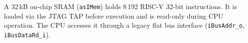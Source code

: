 A 32\,kB on-chip SRAM (\texttt{asIMem}) holds 8\,192 RISC-V 32-bit
instructions.
It is loaded via the JTAG TAP before execution and is read-only
during CPU operation.
The CPU accesses it through a legacy flat bus interface
(\texttt{iBusAddr\_o}, \texttt{iBusDataRd\_i}).
